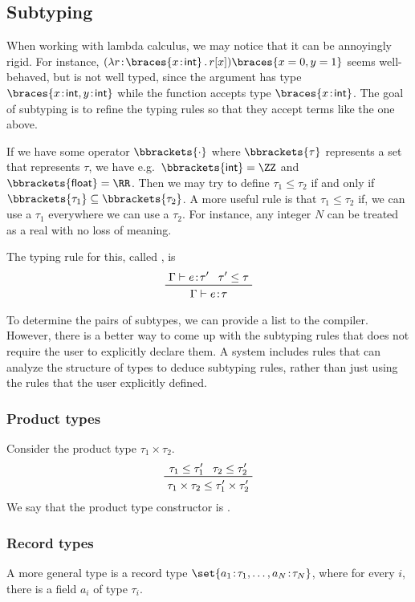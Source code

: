 \documentclass[class=scrartcl]{standalone}
\begin{document}
\subsection{Subtyping}
When working with lambda calculus,
we may notice that it can be annoyingly rigid.
For instance, \((\plambda{r \of \braces{x \of \pint}}{r[x]})\braces{x=0, y=1}\)
seems well-behaved, but is not well typed,
since the argument has type \(\braces{x \of \pint, y \of \pint}\)
while the function accepts type \(\braces{x \of \pint}\).
The goal of subtyping is to refine the typing rules so that
they accept terms like the one above.

If we have some operator \(\bbrackets{\cdot}\) where
\(\bbrackets{\tau}\) represents a set that represents \(\tau\), we have
e.g.\ \(\bbrackets{\pint} = \ZZ\) and \(\bbrackets{\textsf{float}} = \RR\).
Then we may try to define \(\tau_1 \leq \tau_2\) if and only if
\(\bbrackets{\tau_1} \subseteq \bbrackets{\tau_2}\).
A more useful rule is that \(\tau_1 \leq \tau_2\) if,
we can use a \(\tau_1\) everywhere we can use a \(\tau_2\).
For instance, any integer \(N\) can be treated as
a real with no loss of meaning.

The typing rule for this, called , is
\[
  \prftree{\Gamma \vdash e \of \tau'}
          {\tau' \leq \tau}
          {\Gamma \vdash e \of \tau}
\]

To determine the pairs of subtypes, we can provide a list to the compiler.
However, there is a better way to come up with the subtyping rules
that does not require the user to explicitly declare them.
A  system includes rules
that can analyze the structure of types to deduce subtyping rules,
rather than just using the rules that the user explicitly defined.

\subsubsection{Product types}
Consider the product type \(\tau_1 \times \tau_2\).
\[
  \prftree{\tau_1 \leq \tau_1'}
          {\tau_2 \leq \tau_2'}
          {\tau_1 \times \tau_2 \leq \tau_1' \times \tau_2'}
\]
We say that the product type constructor is .

\subsubsection{Record types}
A more general type is a record type
\(\set{a_1 \of \tau_1, \dots, a_N \of \tau_N}\),
where for every \(i\), there is a field \(a_i\) of type \(\tau_i\).
\end{document}
